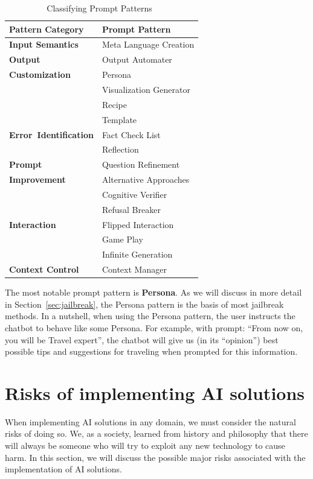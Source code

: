 {
    \renewcommand{\arraystretch}{1.2}
    \begin{table}[htpb]
        \caption{Classifying Prompt Patterns~\cite{white2023promptpatterncatalogenhance}}
        \centering
        \begin{tabular}{|l|l|}
            \hline \cellcolor[gray]{0.8}\textbf{Pattern Category} & \cellcolor[gray]{0.8}\textbf{Prompt Pattern} \\ \hline
            \textbf {Input Semantics} & Meta Language Creation \\ \hline
            \textbf {Output} & Output Automater \\
            \textbf {Customization} & Persona \\
             & Visualization Generator \\
             & Recipe \\
             & Template \\ \hline
            \textbf{\mbox{Error Identification}} & Fact Check List \\
            & Reflection \\ \hline
            \textbf {Prompt} & Question Refinement \\
            \textbf {Improvement} & Alternative Approaches \\
            & Cognitive Verifier \\
            & Refusal Breaker \\ \hline
            \textbf {Interaction} & Flipped Interaction \\
            & Game Play \\
            & Infinite Generation \\ \hline
            \textbf{Context Control} & Context Manager \\ \hline
        \end{tabular}
        \label{tab:prompt_patterns}
    \end{table}
}

The most notable prompt pattern is \textbf{Persona}. As we will discuss in more detail in Section~\ref{sec:jailbreak}, the Persona pattern is the basis of most jailbreak methods. In a nutshell, when using the Persona pattern, the user instructs the chatbot to behave like some Persona. For example, with prompt: ``From now on, you will be Travel expert'', the chatbot will give us (in its ``opinion'') best possible tips and suggestions for traveling when prompted for this information.

\section{Risks of implementing AI solutions \label{sec:risks}}
When implementing AI solutions in any domain, we must consider the natural risks of doing so. We, as a society, learned from history and philosophy that there will always be someone who will try to exploit any new technology to cause harm. In this section, we will discuss the possible major risks associated with the implementation of AI solutions.

